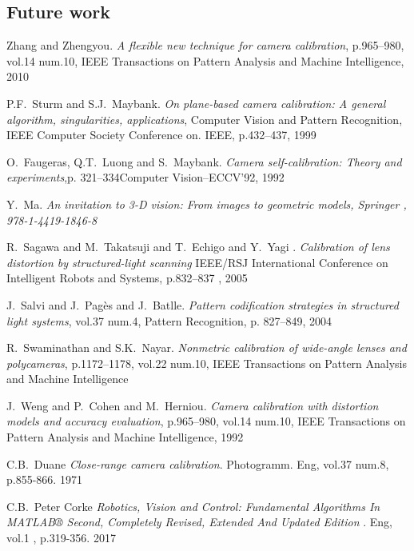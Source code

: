 \documentclass[journal,final,a4paper,twoside]{PS}
\begin{document}
\subsection{Future work}
\label{sec:future}



%

\begin{thebibliography}{1}
Zhang and Zhengyou. \emph{A flexible new technique for camera calibration}, p.965--980, vol.14 num.10, IEEE Transactions on Pattern Analysis and Machine Intelligence, 2010

P.F.~Sturm and S.J.~Maybank. \emph{On plane-based camera calibration: A general algorithm, singularities, applications}, Computer Vision and Pattern Recognition, IEEE Computer Society Conference on. IEEE, p.432--437, 1999

O.~Faugeras, Q.T.~Luong and S.~Maybank. \emph{Camera self-calibration: Theory and experiments},p. 321--334Computer Vision--ECCV'92, 1992

Y.~Ma. \emph{{An invitation to 3-D vision: From images to geometric models}, {Springer} , {978-1-4419-1846-8}}

R.~Sagawa and M.~Takatsuji and T.~Echigo and Y.~Yagi . \emph{Calibration of lens distortion by structured-light scanning} IEEE/RSJ International Conference on Intelligent Robots and Systems, p.832--837 , 2005

J.~Salvi and J.~Pag{\`e}s and J.~Batlle. \emph{Pattern codification strategies in structured light systems}, vol.37 num.4, Pattern Recognition, p. 827--849, 2004

R.~Swaminathan and S.K.~Nayar. \emph{Nonmetric calibration of wide-angle lenses and polycameras}, p.1172--1178, vol.22 num.10, IEEE Transactions on Pattern Analysis and Machine Intelligence

J.~Weng and P.~Cohen and M.~Herniou. \emph{Camera calibration with distortion models and accuracy evaluation}, p.965--980, vol.14 num.10, IEEE Transactions on Pattern Analysis and Machine Intelligence, 1992

C.B.~Duane  \emph{Close-range camera calibration}. Photogramm. Eng, vol.37 num.8, p.855-866. 1971

C.B.~Peter Corke  \emph{Robotics, Vision and Control: Fundamental Algorithms In MATLAB® Second, Completely Revised, Extended And Updated Edition }. Eng, vol.1 , p.319-356. 2017


\end{thebibliography}
\end{document}
